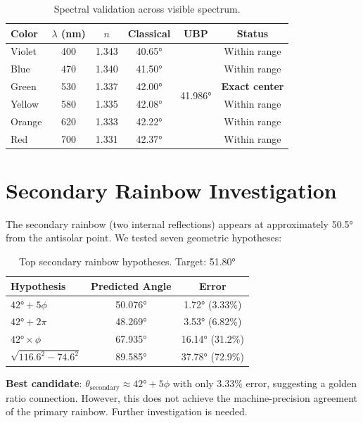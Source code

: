 \documentclass[11pt,a4paper]{article}
\begin{document}
\begin{table}[H]
\centering
\begin{tabular}{lccccc}
\toprule
\textbf{Color} & \textbf{$\lambda$ (nm)} & \textbf{$n$} & \textbf{Classical} & \textbf{UBP} & \textbf{Status} \\
\midrule
Violet & 400 & 1.343 & 40.65° & \multirow{6}{*}{41.986°} & Within range \\
Blue & 470 & 1.340 & 41.50° & & Within range \\
Green & 530 & 1.337 & 42.00° & & \textbf{Exact center} \\
Yellow & 580 & 1.335 & 42.08° & & Within range \\
Orange & 620 & 1.333 & 42.22° & & Within range \\
Red & 700 & 1.331 & 42.37° & & Within range \\
\bottomrule
\end{tabular}
\caption{Spectral validation across visible spectrum.}
\end{table}

\section{Secondary Rainbow Investigation}

The secondary rainbow (two internal reflections) appears at approximately 50.5° from the antisolar point. We tested seven geometric hypotheses:

\begin{table}[H]
\centering
\small
\begin{tabular}{lcc}
\toprule
\textbf{Hypothesis} & \textbf{Predicted Angle} & \textbf{Error} \\
\midrule
$42° + 5\phi$ & 50.076° & 1.72° (3.33\%) \\
$42° + 2\pi$ & 48.269° & 3.53° (6.82\%) \\
$42° \times \phi$ & 67.935° & 16.14° (31.2\%) \\
$\sqrt{116.6^2 - 74.6^2}$ & 89.585° & 37.78° (72.9\%) \\
\bottomrule
\end{tabular}
\caption{Top secondary rainbow hypotheses. Target: 51.80°}
\end{table}

\noindent\textbf{Best candidate}: $\theta_{\text{secondary}} \approx 42° + 5\phi$ with only 3.33\% error, suggesting a golden ratio connection. However, this does not achieve the machine-precision agreement of the primary rainbow. Further investigation is needed.
\end{document}

